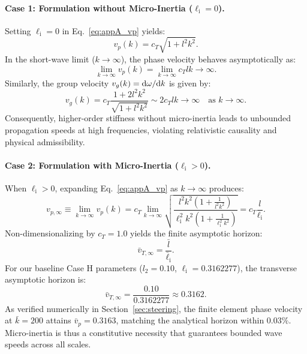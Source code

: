 \paragraph{Case 1: Formulation without Micro-Inertia ($\ell_{\mathrm{i}} = 0$).}
Setting $\ell_{\mathrm{i}} = 0$ in Eq.~\eqref{eq:appA_vp} yields:
\begin{equation}
v_p(k) = c_T \sqrt{1 + l^2 k^2}.
\label{eq:appA_vp_zero}
\end{equation}
In the short-wave limit ($k \to \infty$), the phase velocity behaves asymptotically as:
\begin{equation}
\lim_{k \to \infty} v_p(k) = \lim_{k \to \infty} c_T l k \to \infty.
\label{eq:appA_unbounded}
\end{equation}
Similarly, the group velocity $v_g(k) = \mathrm{d}\omega/\mathrm{d} k$ is given by:
\begin{equation}
v_g(k) = c_T \frac{1 + 2 l^2 k^2}{\sqrt{1 + l^2 k^2}} \sim 2 c_T l k \to \infty \quad \text{as } k \to \infty.
\label{eq:appA_vg_unbounded}
\end{equation}
Consequently, higher-order stiffness without micro-inertia leads to unbounded propagation speeds at high frequencies, violating relativistic causality and physical admissibility.

\paragraph{Case 2: Formulation with Micro-Inertia ($\ell_{\mathrm{i}} > 0$).}
When $\ell_{\mathrm{i}} > 0$, expanding Eq.~\eqref{eq:appA_vp} as $k \to \infty$ produces:
\begin{equation}
v_{p,\infty} \equiv \lim_{k \to \infty} v_p(k) = c_T \lim_{k \to \infty} \sqrt{\frac{l^2 k^2 (1 + \frac{1}{l^2 k^2})}{\ell_{\mathrm{i}}^2 k^2 (1 + \frac{1}{\ell_{\mathrm{i}}^2 k^2})}} = c_T \frac{l}{\ell_{\mathrm{i}}}.
\label{eq:appA_vp_bounded}
\end{equation}
Non-dimensionalizing by $c_T = 1.0$ yields the finite asymptotic horizon:
\begin{equation}
\bar{v}_{T,\infty} = \frac{\bar{l}}{\bar{\ell}_{\mathrm{i}}}.
\label{eq:appA_v_horizon}
\end{equation}
For our baseline Case H parameters ($l_2 = 0.10$, $\ell_{\mathrm{i}} = 0.3162277$), the transverse asymptotic horizon is:
\begin{equation}
\bar{v}_{T,\infty} = \frac{0.10}{0.3162277} \approx 0.3162.
\label{eq:appA_horizon_val}
\end{equation}
As verified numerically in Section~\ref{sec:steering}, the finite element phase velocity at $\bar{k} = 200$ attains $\bar{v}_p = 0.3163$, matching the analytical horizon within $0.03\%$. Micro-inertia is thus a constitutive necessity that guarantees bounded wave speeds across all scales.
